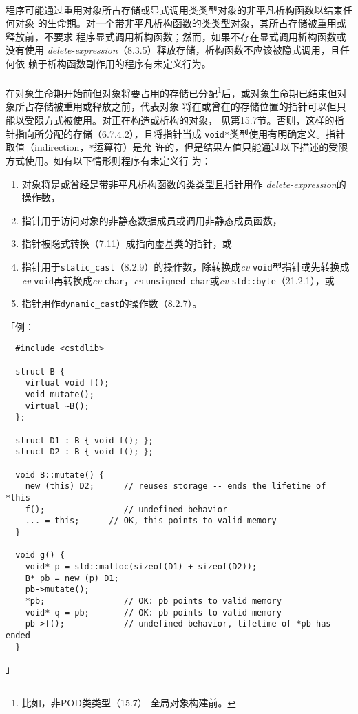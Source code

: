 \paragraph{}
程序可能通过重用对象所占存储或显式调用类类型对象的非平凡析构函数以结束任何对象
的生命期。对一个带非平凡析构函数的类类型对象，其所占存储被重用或释放前，不要求
程序显式调用析构函数；然而，如果不存在显式调用析构函数或没有使用
\textit{delete-expression}（8.3.5）释放存储，析构函数不应该被隐式调用，且任何依
赖于析构函数副作用的程序有未定义行为。

\paragraph{}
在对象生命期开始前但对象将要占用的存储已分配\footnote{比如，非POD类类型（15.7）
全局对象构建前。}后，或对象生命期已结束但对象所占存储被重用或释放之前，代表对象
将在或曾在的存储位置的指针可以但只能以受限方式被使用。对正在构造或析构的对象，
见第15.7节。否则，这样的指针指向所分配的存储（6.7.4.2），且将指针当成
\texttt{void*}类型使用有明确定义。指针取值（indirection，\texttt{*}运算符）是允
许的，但是结果左值只能通过以下描述的受限方式使用。如有以下情形则程序有未定义行
为：
\begin{enumerate}
  \item{对象将是或曾经是带非平凡析构函数的类类型且指针用作
    \textit{delete-expression}的操作数，}
  \item{指针用于访问对象的非静态数据成员或调用非静态成员函数，}
  \item{指针被隐式转换（7.11）成指向虚基类的指针，或}
  \item{指针用于\texttt{static\_cast}（8.2.9）的操作数，除转换成\textit{cv}
    \texttt{void}型指针或先转换成\textit{cv} \texttt{void}再转换成\textit{cv}
    \texttt{char}，\textit{cv} \texttt{unsigned char}或\textit{cv}
    \texttt{std::byte}（21.2.1），或}
  \item{指针用作\texttt{dynamic\_cast}的操作数（8.2.7）。}
\end{enumerate}
「例：
\begin{lstlisting}
  #include <cstdlib>

  struct B {
    virtual void f();
    void mutate();
    virtual ~B();
  };

  struct D1 : B { void f(); };
  struct D2 : B { void f(); };

  void B::mutate() {
    new (this) D2;      // reuses storage -- ends the lifetime of *this
    f();                // undefined behavior
    ... = this;      // OK, this points to valid memory
  }

  void g() {
    void* p = std::malloc(sizeof(D1) + sizeof(D2));
    B* pb = new (p) D1;
    pb->mutate();
    *pb;                // OK: pb points to valid memory
    void* q = pb;       // OK: pb points to valid memory
    pb->f();            // undefined behavior, lifetime of *pb has ended
  }
\end{lstlisting}」

